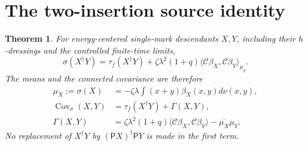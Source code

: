 \documentclass[11pt]{article}
\newcommand{\PP}{\mathsf P}
\newtheorem{theorem}{Theorem}
\begin{document}
\newpage
\section{The two-insertion source identity}
\begin{theorem}\label{two}
For energy-centered single-mark descendants $X,Y$, including
their $h$-dressings and the controlled finite-time limits,
\begin{equation}\label{uncentered}
 \boxed{\sigma(X^\dagger Y)=\tau_f(X^\dagger Y)
 +\zeta\lambda^2(1+q)
       \langle\mathcal C\beta_X,\mathcal C\beta_Y\rangle_{\mu_q}.}
\end{equation}
The means and the connected covariance are therefore
\begin{align}\label{mu}
 \mu_X:=\sigma(X)&=-\zeta\lambda
                 \int(x+y)\beta_X(x,y)d\nu(x,y),\\
 \operatorname{Cov}_{\sigma}(X,Y)
 &=\tau_f(X^\dagger Y)+\Gamma(X,Y),\label{connected}\\
 \Gamma(X,Y)&=\zeta\lambda^2(1+q)
      \langle\mathcal C\beta_X,\mathcal C\beta_Y\rangle
                  -\overline{\mu_X}\mu_Y.\label{Gamma}
\end{align}
No replacement of $X^\dagger Y$ by $(\PP X)^\dagger\PP Y$
is made in the first term.
\end{theorem}
\end{document}
